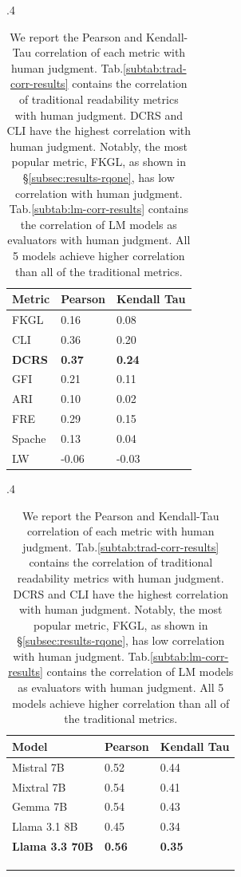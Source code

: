 \begin{table}[!t]
\centering
    \begin{subtable}{.4\textwidth}
        \centering \footnotesize
        \begin{tabular}{l|ll}
            \textbf{Metric} & \textbf{Pearson} & \textbf{Kendall Tau} \\ \hline
             FKGL &  0.16 & 0.08 \\
            CLI & 0.36 & 0.20 \\
            \textbf{DCRS} & \textbf{0.37} & \textbf{0.24} \\
            GFI & 0.21 & 0.11 \\
            ARI & 0.10 & 0.02 \\
            FRE & 0.29 & 0.15 \\
            Spache & 0.13 & 0.04 \\
            LW & -0.06 & -0.03 \\
        \end{tabular}
        \caption{Traditional metric scores correlation with human judgment.}
        \label{subtab:trad-corr-results}
    \end{subtable}    
    \hspace{4mm}
    \begin{subtable}{.4\textwidth}
        \centering \footnotesize
            \begin{tabular}{l|ll}
            \textbf{Model} & \textbf{Pearson} & \textbf{Kendall Tau} \\ \hline
            Mistral 7B & 0.52 & 0.44 \\
            Mixtral 7B & 0.54 & 0.41 \\
            Gemma 7B & 0.54 & 0.43 \\
            Llama 3.1 8B & 0.45 & 0.34 \\
            \textbf{Llama 3.3 70B} & \textbf{0.56} & \textbf{0.35} \\
            \multicolumn{3}{l}{} \\
            \multicolumn{3}{l}{} \\
            \multicolumn{3}{l}{} \\
        \end{tabular}
        \caption{LM scores correlation with human judgment.}\label{subtab:lm-corr-results}
    \end{subtable} 
    \caption{We report the Pearson and Kendall-Tau correlation of each metric with human judgment. Tab.\ref{subtab:trad-corr-results} contains the correlation of traditional readability metrics with human judgment. DCRS and CLI have the highest correlation with human judgment. Notably, the most popular metric, FKGL, as shown in \S\ref{subsec:results-rqone}, has low correlation with human judgment. Tab.\ref{subtab:lm-corr-results} contains the correlation of LM models as evaluators with human judgment. All 5 models achieve higher correlation than all of the traditional metrics.
    }
    \label{tab:corr-results}

\end{table}